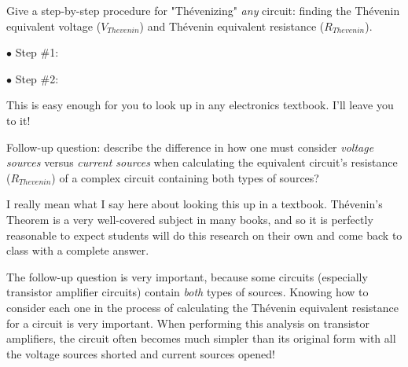 

Give a step-by-step procedure for "Th\'evenizing" {\it any} circuit: finding the Th\'evenin equivalent voltage ($V_{Thevenin}$) and Th\'evenin equivalent resistance ($R_{Thevenin}$).

\medskip
\goodbreak
\item{$\bullet$} Step \#1:
\vskip 5pt
\item{$\bullet$} Step \#2:
\medskip







This is easy enough for you to look up in any electronics textbook.  I'll leave you to it!

\vskip 10pt

Follow-up question: describe the difference in how one must consider {\it voltage sources} versus {\it current sources} when calculating the equivalent circuit's resistance ($R_{Thevenin}$) of a complex circuit containing both types of sources?







I really mean what I say here about looking this up in a textbook.  Th\'evenin's Theorem is a very well-covered subject in many books, and so it is perfectly reasonable to expect students will do this research on their own and come back to class with a complete answer.

The follow-up question is very important, because some circuits (especially transistor amplifier circuits) contain {\it both} types of sources.  Knowing how to consider each one in the process of calculating the Th\'evenin equivalent resistance for a circuit is very important.  When performing this analysis on transistor amplifiers, the circuit often becomes much simpler than its original form with all the voltage sources shorted and current sources opened!




